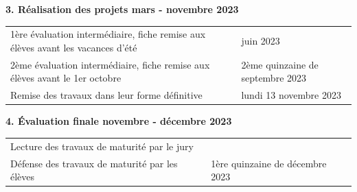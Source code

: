 \documentclass[
  10pt,
  french,
  a5paper,
  openany]{book}
\begin{document}

\clearpage


\textbf{3. Réalisation des projets \hfill mars - novembre 2023}

\begin{longtable}[]{@{}ll@{}}
\toprule
\endhead
\begin{minipage}[t]{0.67\columnwidth}\raggedright
1ère évaluation intermédiaire, fiche remise aux élèves avant les vacances d'été\strut
\end{minipage} & \begin{minipage}[t]{0.27\columnwidth}\raggedright
juin 2023\strut
\end{minipage}\tabularnewline
\begin{minipage}[t]{0.67\columnwidth}\raggedright
2ème évaluation intermédiaire, fiche remise aux élèves avant le 1er octobre\strut
\end{minipage} & \begin{minipage}[t]{0.27\columnwidth}\raggedright
2ème quinzaine de septembre 2023\strut
\end{minipage}\tabularnewline
\begin{minipage}[t]{0.67\columnwidth}\raggedright
Remise des travaux dans leur forme définitive\strut
\end{minipage} & \begin{minipage}[t]{0.27\columnwidth}\raggedright
lundi 13 novembre 2023\strut
\end{minipage}\tabularnewline
\bottomrule
\end{longtable}


\textbf{4. Évaluation finale \hfill novembre - décembre 2023}

\begin{longtable}[]{@{}ll@{}}
\toprule
\endhead
\begin{minipage}[t]{0.56\columnwidth}\raggedright
Lecture des travaux de maturité par le jury\strut
\end{minipage} & \begin{minipage}[t]{0.38\columnwidth}\raggedright
\strut
\end{minipage}\tabularnewline
\begin{minipage}[t]{0.56\columnwidth}\raggedright
Défense des travaux de maturité par les élèves\strut
\end{minipage} & \begin{minipage}[t]{0.38\columnwidth}\raggedright
1ère quinzaine de décembre 2023\strut
\end{minipage}\tabularnewline
\bottomrule
\end{longtable}
\end{document}
